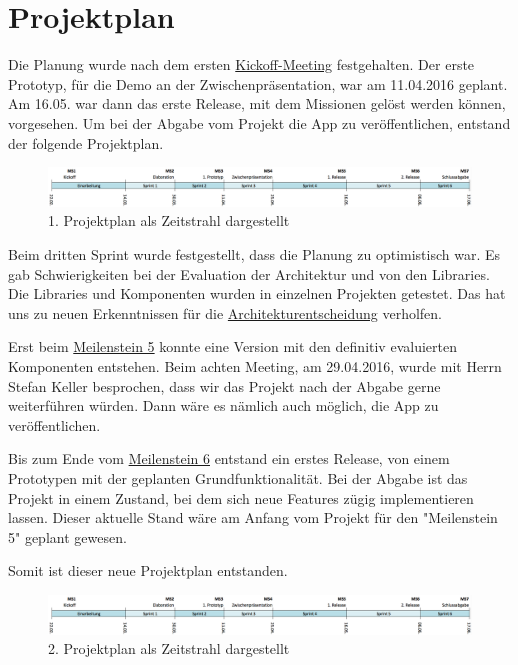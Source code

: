 


\section{Projektplan}

Die Planung wurde nach dem ersten \hyperref[pm-ms1]{Kickoff-Meeting} festgehalten. 
Der erste Prototyp, für die Demo an der Zwischenpräsentation, war am 11.04.2016 geplant. 
Am 16.05. war dann das erste Release, mit dem Missionen gelöst werden können, vorgesehen. 
Um bei der Abgabe vom Projekt die App zu veröffentlichen, entstand der folgende Projektplan.

\begin{figure}[H]
	\centering
	\includegraphics[width=\textwidth]{images/projektmanagement/zeitstrahl_v1.png}
	\caption{1. Projektplan als Zeitstrahl dargestellt}
	\label{image-project-plan-timeline1}
\end{figure}

Beim dritten Sprint wurde festgestellt, dass die Planung zu optimistisch war. 
Es gab Schwierigkeiten bei der Evaluation der Architektur und von den Libraries. 
Die Libraries und Komponenten wurden in einzelnen Projekten getestet. 
Das hat uns zu neuen Erkenntnissen für die \hyperref[tb-evaluation-architektur]{Architekturentscheidung} verholfen. 

Erst beim \hyperref[pm-ms5]{Meilenstein 5} konnte eine Version mit den definitiv evaluierten Komponenten entstehen. 
Beim achten Meeting, am 29.04.2016, wurde mit Herrn Stefan Keller besprochen, dass wir das Projekt nach der Abgabe gerne weiterführen würden.
Dann wäre es nämlich auch möglich, die App zu veröffentlichen.

Bis zum Ende vom \hyperref[pm-ms6]{Meilenstein 6} entstand ein erstes Release, von einem Prototypen mit der geplanten Grundfunktionalität. 
Bei der Abgabe ist das Projekt in einem Zustand, bei dem sich neue Features zügig implementieren lassen.
Dieser aktuelle Stand wäre am Anfang vom Projekt für den "Meilenstein 5" geplant gewesen.

Somit ist dieser neue Projektplan entstanden.

\begin{figure}[H]
	\centering
	\includegraphics[width=\textwidth]{images/projektmanagement/zeitstrahl_v1.png}
	\caption{2. Projektplan als Zeitstrahl dargestellt}
	\label{image-project-plan-timeline2}
\end{figure}




